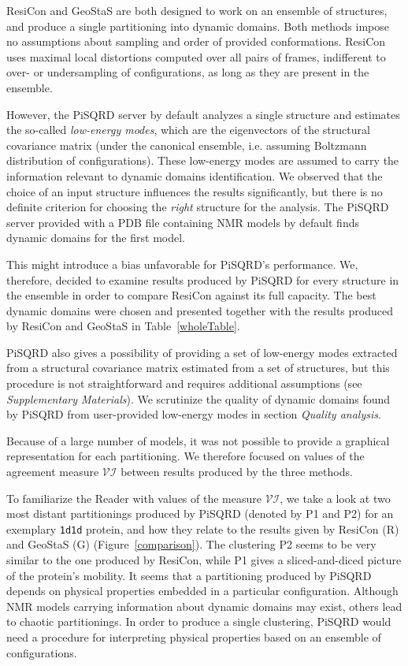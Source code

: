 ResiCon and GeoStaS are both designed to work on an ensemble of structures, and produce a single partitioning into dynamic domains.
Both methods impose no assumptions about sampling and order of provided conformations.
ResiCon uses maximal local distortions computed over all pairs of frames, indifferent to over- or undersampling of configurations, as long as they are present in the ensemble.

However, the PiSQRD server by default analyzes a single structure and estimates the so-called \emph{low-energy modes}, which are the eigenvectors of the structural covariance matrix (under the canonical ensemble, i.e. assuming Boltzmann distribution of configurations).
These low-energy modes are assumed to carry the information relevant to dynamic domains identification.
We observed that the choice of an input structure influences the results significantly, but there is no definite criterion for choosing the \emph{right} structure for the analysis.
The PiSQRD server provided with a PDB file containing NMR models by default finds dynamic domains for the first model.

This might introduce a bias unfavorable for PiSQRD's performance. 
We, therefore, decided to examine results produced by PiSQRD for every structure in the ensemble in order to compare ResiCon against its full capacity.
The best dynamic domains were chosen and presented together with the results produced by ResiCon and GeoStaS in Table~\ref{wholeTable}.

PiSQRD also gives a possibility of providing a set of low-energy modes extracted from a structural covariance matrix estimated from a set of structures, but this procedure is not straightforward and requires additional assumptions (see \emph{Supplementary Materials}).
We scrutinize the quality of dynamic domains found by PiSQRD from user-provided low-energy modes in section \emph{Quality analysis}.

Because of a large number of models, it was not possible to provide a graphical representation for each partitioning.
We therefore focused on values of the agreement measure $\mathcal{VI}$ between results produced by the three methods.

To familiarize the Reader with values of the measure $\mathcal{VI}$, we take a look at two most distant partitionings produced by PiSQRD (denoted by P1 and P2) for an exemplary \texttt{1d1d} protein, and how they relate to the results given by ResiCon (R) and GeoStaS (G) (Figure~\ref{comparison}).
The clustering P2 seems to be very similar to the one produced by ResiCon, while P1 gives a sliced-and-diced picture of the protein's mobility.
It seems that a partitioning produced by PiSQRD depends on physical properties embedded in a particular configuration.
Although NMR models carrying information about dynamic domains may exist, others lead to chaotic partitionings.
In order to produce a single clustering, PiSQRD would need a procedure for interpreting physical properties based on an ensemble of configurations.

